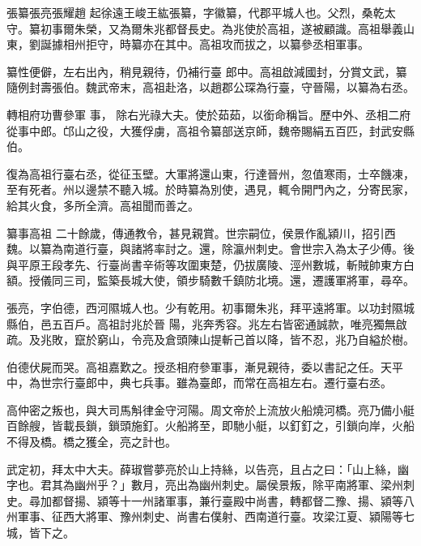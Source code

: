 
\begin{pinyinscope}

 張纂張亮張耀趙
 起徐遠王峻王紘張纂，字徽纂，代郡平城人也。父烈，桑乾太守。纂初事爾朱榮，又為爾朱兆都督長史。為兆使於高祖，遂被顧識。高祖舉義山東，劉誕據相州拒守，時纂亦在其中。高祖攻而拔之，以纂參丞相軍事。



 纂性便僻，左右出內，稍見親待，仍補行臺
 郎中。高祖啟減國封，分賞文武，纂隨例封壽張伯。魏武帝末，高祖赴洛，以趙郡公琛為行臺，守晉陽，以纂為右丞。



 轉相府功曹參軍
 事，
 除右光祿大夫。使於茹茹，以銜命稱旨。歷中外、丞相二府從事中郎。邙山之役，大獲俘虜，高祖令纂部送京師，魏帝賜絹五百匹，封武安縣伯。



 復為高祖行臺右丞，從征玉壁。大軍將還山東，行達晉州，忽值寒雨，士卒饑凍，至有死者。州以邊禁不聽入城。於時纂為別使，遇見，輒令開門內之，分寄民家，給其火食，多所全濟。高祖聞而善之。



 纂事高祖
 二十餘歲，傳通教令，甚見親賞。世宗嗣位，侯景作亂潁川，招引西魏。以纂為南道行臺，與諸將率討之。還，除瀛州刺史。會世宗入為太子少傅。後與平原王段孝先、行臺尚書辛術等攻圍東楚，仍拔廣陵、涇州數城，斬賊帥東方白額。授儀同三司，監築長城大使，領步騎數千鎮防北境。還，遷護軍將軍，尋卒。



 張亮，字伯德，西河隰城人也。少有乾用。初事爾朱兆，拜平遠將軍。以功封隰城縣伯，邑五百戶。高祖討兆於晉
 陽，兆奔秀容。兆左右皆密通誠款，唯亮獨無啟疏。及兆敗，竄於窮山，令亮及倉頭陳山提斬己首以降，皆不忍，兆乃自縊於樹。



 伯德伏屍而哭。高祖嘉歎之。授丞相府參軍事，漸見親待，委以書記之任。天平中，為世宗行臺郎中，典七兵事。雖為臺郎，而常在高祖左右。遷行臺右丞。



 高仲密之叛也，與大司馬斛律金守河陽。周文帝於上流放火船燒河橋。亮乃備小艇百餘艘，皆載長鎖，鎖頭施釘。火船將至，即馳小艇，以釘釘之，引鎖向岸，火船
 不得及橋。橋之獲全，亮之計也。



 武定初，拜太中大夫。薛琡嘗夢亮於山上持絲，以告亮，且占之曰：「山上絲，幽字也。君其為幽州乎？」數月，亮出為幽州刺史。屬侯景叛，除平南將軍、梁州刺史。尋加都督揚、潁等十一州諸軍事，兼行臺殿中尚書，轉都督二豫、揚、潁等八州軍事、征西大將軍、豫州刺史、尚書右僕射、西南道行臺。攻梁江夏、潁陽等七城，皆下之。




\end{pinyinscope}

